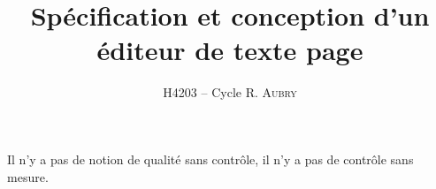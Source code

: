 


\title{Spécification et conception d'un éditeur de texte page}
\author{H4203 -- Cycle R. \textsc{Aubry}}
\lhead{}



\maketitle
\tableofcontents 

\begin{nAbstract}
Il n'y a pas de notion de qualité sans contrôle, il n'y a pas de contrôle sans mesure.
\end{nAbstract}
\newpage


\newpage


\newpage




